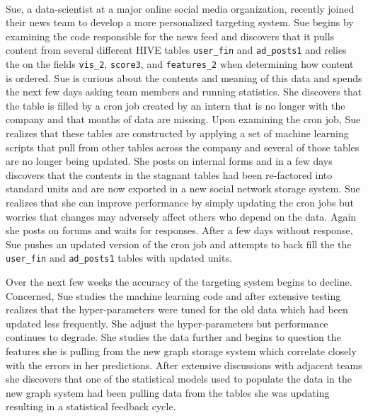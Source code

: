 \documentclass{sig-alternate}
\begin{document}
\\
Sue, a data-scientist at a major online social media organization, recently joined their news team to develop a more personalized targeting system.
Sue begins by examining the code responsible for the news feed and discovers that it pulls content from several different HIVE tables \verb|user_fin| and \verb|ad_posts1| and relies the on the fields \verb|vis_2|, \verb|score3|, and \verb|features_2| when determining how content is ordered. 
Sue is curious about the contents and meaning of this data and spends the next few days asking team members and running statistics.
She discovers that the table is filled by a cron job created by an intern that is no longer with the company and that months of data are missing.
Upon examining the cron job, Sue realizes that these tables are constructed by applying a set of machine learning scripts that pull from other tables across the company and several of those tables are no longer being updated.
She posts on internal forms and in a few days discovers that the contents in the stagnant tables had been re-factored into standard units and are now exported in a new social network storage system.
Sue realizes that she can improve performance by simply updating the cron jobs but worries that changes may adversely affect others who depend on the data.  
Again she posts on forums and waits for responses.
After a few days without response, Sue pushes an updated version of the cron job and attempts to back fill the the \verb|user_fin| and \verb|ad_posts1| tables with updated units.

Over the next few weeks the accuracy of the targeting system begins to decline.
Concerned, Sue studies the machine learning code and after extensive testing realizes that the hyper-parameters were tuned for the old data which had been updated less frequently.  
She adjust the hyper-parameters but performance continues to degrade.  
She studies the data further and begins to question the features she is pulling from the new graph storage system which correlate closely with the errors in her predictions.
After extensive discussions with adjacent teams she discovers that one of the statistical models used to populate the data in the new graph system had been pulling data from the tables she was updating resulting in a statistical feedback cycle. 
\end{document}
